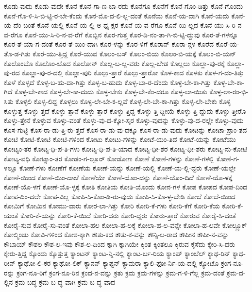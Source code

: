 {ಕೊಡು-ವುದು
ಕೊಡು-ವುದೇ
ಕೊನೆ
ಕೊನೆ-ಗಾ-ಣ-ಬಾ-ರದು
ಕೊನೆಗೂ
ಕೊನೆಗೆ
ಕೊನೆ-ಗೊಂ-ಡಿತ್ತು
ಕೊನೆ-ಗೊಂದು
ಕೊನೆ-ಗೊ-ಳಿ-ಸಿ-ಬಿ-ಟ್ಟಿ-ರ-ಬೇ-ಕೆಂದು
ಕೊನೆ-ಮೊ-ದ-ಲಿ-ಲ್ಲ-ದಂತೆ
ಕೊನೆಯ
ಕೊನೆ-ಯ-ದಾಗಿ
ಕೊನೆ-ಯದು
ಕೊನೆ-ಯ-ದೆಂ-ಬಂತೆ
ಕೊನೆ-ಯಲ್ಲಿ
ಕೊನೆ-ಯ-ಲ್ಲಿ-ಅ-ಧ್ಯ-ಕ್ಷರ
ಕೊನೆ-ಯ-ವ-ರೆಗೂ
ಕೊನೆ-ಯಿ-ಲ್ಲದ
ಕೊನೆ-ಯು-ಸಿ-ರಿ-ನ-ವ-ರೆಗೂ
ಕೊನೆ-ಯು-ಸಿ-ರಿ-ನ-ವ-ರೆಗೆ
ಕೊಬ್ಬಿನ
ಕೊರ-ಗುತ್ತ
ಕೊರ-ಡಿ-ನಂ-ತಾ-ಗಿ-ಬಿ-ಟ್ಟಿ-ದ್ದುವು
ಕೊರ-ತೆ-ಗಳನ್ನೂ
ಕೊರ-ತೆ-ಯಾ-ಗ-ದಂತೆ
ಕೊರ-ತೆ-ಯಿಂ-ದಾಗಿ
ಕೊರ-ಳನ್ನು
ಕೊರ-ಳಿಗೆ
ಕೊರಾನ್
ಕೊರಾ-ನ್ಗಳ
ಕೊರೆದ
ಕೊರೆ-ಯ-ತೊ-ಡ-ಗಿತು
ಕೊರೆ-ಯು-ತ್ತಿದ್ದ
ಕೊರೆ-ಯುವ
ಕೊಲಂ-ಬಸ್
ಕೊಲಂ-ಬಿಯ
ಕೊಲಂ-ಬಿ-ಯಕ್ಕೆ
ಕೊಲಂ-ಬಿ-ಯನ್
ಕೊಲೊಂಬೊ
ಕೊಲೊಂ-ಬೊದ
ಕೊಲೋನ್
ಕೊಲ್ಲ-ಬ-ಲ್ಲ-ವರು
ಕೊಲ್ಲ-ಬೇಡ
ಕೊಲ್ಲಲು
ಕೊಲ್ಲಾ-ಪು-ರಕ್ಕೆ
ಕೊಲ್ಲಾ-ಪು-ರದ
ಕೊಲ್ಲಾ-ಪು-ರ-ದಲ್ಲಿ
ಕೊಲ್ಲಾ-ಪುರಿ
ಕೊಲ್ಲು-ತ್ತಾರೆ
ಕೊಲ್ಲು-ತ್ತಾರೋ
ಕೊಳ-ಕಾದ
ಕೊಳಕು
ಕೊಳ-ಗ-ದಂ-ತಿತ್ತು
ಕೊಳೆ
ಕೊಳ್ಳದೆ
ಕೊಳ್ಳ-ಬ-ಹು-ದಾ-ಗಿತ್ತು
ಕೊಳ್ಳ-ಬ-ಹುದು
ಕೊಳ್ಳ-ಬಾ-ರ-ದೆಂದು
ಕೊಳ್ಳ-ಬೇ-ಕಾ-ಗಿತ್ತು
ಕೊಳ್ಳ-ಬೇ-ಕಾ-ಗಿದೆ
ಕೊಳ್ಳ-ಬೇ-ಕಾದ
ಕೊಳ್ಳ-ಬೇ-ಕಾ-ದುದು
ಕೊಳ್ಳ-ಬೇಕು
ಕೊಳ್ಳ-ಬೇ-ಕೆಂ-ದರೂ
ಕೊಳ್ಳ-ಲಾ-ಯಿತು
ಕೊಳ್ಳ-ಲಾ-ರಂ-ಭಿ-ಸಿತು
ಕೊಳ್ಳಲಿ
ಕೊಳ್ಳ-ಲಿದ್ದ
ಕೊಳ್ಳಲು
ಕೊಳ್ಳ-ಲೇ-ಬೇ-ಕ-ಲ್ಲವೆ
ಕೊಳ್ಳ-ಲೇ-ಬೇ-ಕಾ-ಗಿತ್ತು
ಕೊಳ್ಳ-ಲೇ-ಬೇಕು
ಕೊಳ್ಳಿ
ಕೊಳ್ಳುತ್ತ
ಕೊಳ್ಳು-ತ್ತದೆ
ಕೊಳ್ಳು-ತ್ತಾನೆ
ಕೊಳ್ಳು-ತ್ತಾರೆ
ಕೊಳ್ಳು-ತ್ತಿದ್ದ
ಕೊಳ್ಳು-ತ್ತಿ-ದ್ದೀಯೆ
ಕೊಳ್ಳು-ತ್ತಿ-ದ್ದುದು
ಕೊಳ್ಳು-ತ್ತೀರೊ
ಕೊಳ್ಳು-ತ್ತೇನೆ
ಕೊಳ್ಳುವ
ಕೊಳ್ಳು-ವಂತೆ
ಕೊಳ್ಳು-ವು-ದ-ಕ್ಕೋ-ಸ್ಕರ
ಕೊಳ್ಳು-ವುದನ್ನು
ಕೊಳ್ಳು-ವು-ದ-ರಲ್ಲೇ
ಕೊಳ್ಳು-ವುದು
ಕೊಸ-ಗುಟ್ಟಿ
ಕೊಸ-ರಾ-ಡು-ತ್ತಿ-ರು-ತ್ತದೆ
ಕೊಸ-ರಾ-ಡು-ವು-ದಕ್ಕೂ
ಕೊಸ-ರಾ-ಡು-ವುದು
ಕೋಟನ್ನು
ಕೋಟಾ-ಪ್ರಾಂ-ತದ
ಕೋಟಿ
ಕೋಟಿ-ಕೋಟಿ
ಕೋಟಿ-ಗಳಿಂದ
ಕೋಟು
ಕೋಟು-ಗಳನ್ನು
ಕೋಟೆ-ಯಂ-ತಿದೆ
ಕೋಟೆ-ಯನ್ನು
ಕೋಟೆಯು
ಕೋಟ್ಯಂ-ತರ
ಕೋಟ್ಯ-ಧಿ-ಪ-ತಿ-ಗಳು
ಕೋಟ್ಯ-ಧಿ-ಪ-ತಿ-ಯಾದ
ಕೋಟ್ಯ-ಧೀ-ಶರ
ಕೋಟ್ಯ-ಧೀ-ಶರು
ಕೋಟ್ಯ-ನು-ಕೋಟಿ
ಕೋಟ್ಯ-ವಧಿ
ಕೋಟ್ಯಾಂ-ತರ
ಕೋಡಂ-ಗ-ಲ್ಲೂರ್
ಕೋಡೋಣ
ಕೋಣೆ
ಕೋಣೆ-ಗಳನ್ನು
ಕೋಣೆ-ಗಳಲ್ಲಿ
ಕೋಣೆ-ಗ-ಳಲ್ಲೂ
ಕೋಣೆ-ಗಳು
ಕೋಣೆಗೆ
ಕೋಣೆಯ
ಕೋಣೆ-ಯನ್ನು
ಕೋಣೆ-ಯಲ್ಲಿ
ಕೋಣೆ-ಯ-ಲ್ಲಿ-ದ್ದರು
ಕೋಣೆ-ಯಲ್ಲೇ
ಕೋಣೆ-ಯಿಂದ
ಕೋಣೆ-ಯಿಂ-ದಾಚೆ
ಕೋಣೆಯೇ
ಕೋಣೆ-ಯೊಂ-ದನ್ನು
ಕೋಣೆ-ಯೊಂ-ದಿದೆ
ಕೋಣೆ-ಯೊ-ಳಕ್ಕೆ
ಕೋಣೆ-ಯೊ-ಳಗೆ
ಕೋಣೆ-ಯೊ-ಳ್ಳಕ್ಕೆ
ಕೋತಿ
ಕೋತಿಯ
ಕೋತಿ-ಯೊಂದು
ಕೋನ-ಗಳ
ಕೋಪ
ಕೋಪದ
ಕೋಪ-ದಿಂದ
ಕೋಪ-ದಿಂ-ದಲೇ
ಕೋಪ-ವಿಲ್ಲ
ಕೋಪಿ-ಸಿ-ಕೊಂ-ಡಿ-ರು-ವುದು
ಕೋಪಿ-ಸಿ-ಕೊ-ಳ್ಳ-ಬೇಡಿ
ಕೋಬೆ
ಕೋಬೆ-ಯಿಂದ
ಕೋಮಿಗೆ
ಕೋಮಿನ
ಕೋಮು-ವಾರು
ಕೋರ-ಲಾ-ಗಿತ್ತು
ಕೋರಿ
ಕೋರಿ-ಕೆ-ಗಳು
ಕೋರಿ-ಕೆಗೆ
ಕೋರಿ-ಕೆಯ
ಕೋರಿ-ಕೆ-ಯಂತೆ
ಕೋರಿ-ಕೆ-ಯನ್ನು
ಕೋರಿ-ಕೆ-ಯಿದೆ
ಕೋರಿ-ದರು
ಕೋರಿ-ದ್ದರು
ಕೋರು-ತ್ತಾರೆ
ಕೋರುವ
ಕೋರೈ-ಸಿ-ದಂತೆ
ಕೋರೈ-ಸುವ
ಕೋರೈ-ಸು-ವಂತೆ
ಕೋಲಾ-ಹಲ
ಕೋಲಾ-ಹ-ಲಕ್ಕೆ
ಕೋಲಾ-ಹ-ಲ-ವನ್ನೇ
ಕೋಲಾ-ಹ-ಲವೇ
ಕೋಲ್ಬ್ರೂಕ್
ಕೋಲ್ಮಿಂಚು
ಕೋವಿ-ಗಳಿಂದ
ಕೋಶ-ಕ್ಕಾಗಿ
ಕೌತು-ಕದ
ಕೌತು-ಕ-ವನ್ನು
ಕೌನ್ಸಿ-ಲ-ರಾದ
ಕೌಪೀನ
ಕೌಪೀ-ನ-ವನ್ನು
ಕೌಬಾಯ್
ಕೌಶಲ
ಕೌಶ-ಲ-ಇವು
ಕೌಶ-ಲ-ದಿಂದ
ಕ್ಕಾಗಿ
ಕ್ಕಾಗಿಯೇ
ಕ್ಕಿಂತ
ಕ್ಕಿಂತಲೂ
ಕ್ಕಿರುವ
ಕ್ಕೆಸೆದು
ಕ್ಕೇರಿ-ಸಿ-ದರು
ಕ್ಕೇರು-ತ್ತಿದ್ದ
ಕ್ಕೊಂದು
ಕ್ಕೊತ್ತುತ್ತ
ಕ್ಯಾಂಟನ್
ಕ್ಯಾಂಟ-ನ್ನಿ-ನಲ್ಲಿ
ಕ್ಯಾಂಟ-ರ್ಬ-ರಿಯ
ಕ್ಯಾಂಪ್
ಕ್ಯಾಂಬೆಲ್
ಕ್ಯಾಥ-ರಿನ್
ಕ್ಯಾಥ-ರೀನ್
ಕ್ಯಾಥೋ-ಲಿ-ಕರ
ಕ್ಯಾಥೋ-ಲಿಕ್
ಕ್ಯಾನನ್
ಕ್ಯಾಪ್ಟನ್
ಕ್ಯಾಮರಾ
ಕ್ಯಾಲಿ-ಫೋ-ರ್ನಿ-ಯ-ದಲ್ಲಿ
ಕ್ಯೋಟೊ
ಕ್ರಂಗ-ನೂ-ರನ್ನು
ಕ್ರಂಗ-ನೂ-ರಿಗೆ
ಕ್ರಂಗ-ನೂ-ರಿನ
ಕ್ರಂದ-ನ-ವನ್ನು
ಕ್ರತು
ಕ್ರಮ
ಕ್ರಮ-ಗಳನ್ನು
ಕ್ರಮ-ಗ-ಳಿ-ಗೆಲ್ಲ
ಕ್ರಮ-ದಂತೆ
ಕ್ರಮ-ದ-ಲ್ಲಿನ
ಕ್ರಮ-ಬದ್ಧ
ಕ್ರಮ-ಬ-ದ್ಧ-ವಾಗಿ
ಕ್ರಮ-ಬ-ದ್ಧ-ವಾದ
}
